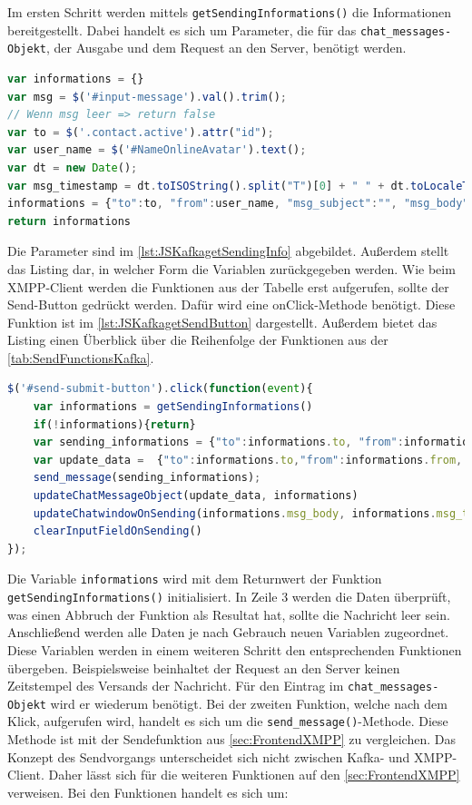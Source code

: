 \documentclass[a4paper,titlepage,halfparskip,12pt]{scrreprt}
\begin{document}
\begin{onehalfspacing}
Im ersten Schritt werden mittels \texttt{getSendingInformations()} die Informationen bereitgestellt. Dabei handelt es sich um Parameter, die für das \texttt{chat\_messages-Objekt}, der Ausgabe und dem Request an den Server, benötigt werden.
\begin{lstlisting}[language=Javascript,caption=\texttt{getSendingInformations()},label={lst:JSKafkagetSendingInfo}]
var informations = {}
var msg = $('#input-message').val().trim();
// Wenn msg leer => return false
var to = $('.contact.active').attr("id");
var user_name = $('#NameOnlineAvatar').text();
var dt = new Date();
var msg_timestamp = dt.toISOString().split("T")[0] + " " + dt.toLocaleTimeString().substring(0,5);
informations = {"to":to, "from":user_name, "msg_subject":"", "msg_body":msg,"msg_type":"chat", "msg_timestamp":msg_timestamp}
return informations
\end{lstlisting}
Die Parameter sind im \autoref{lst:JSKafkagetSendingInfo} abgebildet. Außerdem stellt das Listing dar, in welcher Form die Variablen zurückgegeben werden. Wie beim XMPP-Client werden die Funktionen aus der Tabelle erst aufgerufen, sollte der Send-Button gedrückt werden. Dafür wird eine \dq onClick\dq-Methode benötigt. Diese Funktion ist im \autoref{lst:JSKafkagetSendButton} dargestellt. Außerdem bietet das Listing einen Überblick über die Reihenfolge der Funktionen aus der \autoref{tab:SendFunctionsKafka}.
\begin{lstlisting}[language=Javascript,caption=Verknüpfte Funktion mit dem HTML-Element,label={lst:JSKafkagetSendButton}]
$('#send-submit-button').click(function(event){
	var informations = getSendingInformations()
	if(!informations){return}
	var sending_informations = {"to":informations.to, "from":informations.from, "msg_subject":informations.msg_subject, "msg_body":informations.msg_body,"msg_type":"chat"}
	var update_data =  {"to":informations.to,"from":informations.from, "msg_body":informations.msg_body, "msg_timestamp":informations.msg_timestamp}
	send_message(sending_informations);
	updateChatMessageObject(update_data, informations)
	updateChatwindowOnSending(informations.msg_body, informations.msg_timestamp)
	clearInputFieldOnSending()
});
\end{lstlisting}
Die Variable \texttt{informations} wird mit dem Returnwert der Funktion \texttt{getSendingInformations()} initialisiert. In Zeile 3 werden die Daten überprüft, was einen Abbruch der Funktion als Resultat hat, sollte die Nachricht leer sein. Anschließend werden alle Daten je nach Gebrauch neuen Variablen zugeordnet. Diese Variablen werden in einem weiteren Schritt den entsprechenden Funktionen übergeben. Beispielsweise beinhaltet der Request an den Server keinen Zeitstempel des Versands der Nachricht. Für den Eintrag im \texttt{chat\_messages-Objekt} wird er wiederum benötigt. Bei der zweiten Funktion, welche nach dem Klick, aufgerufen wird, handelt es sich um die \texttt{send\_message()}-Methode. Diese Methode ist mit der Sendefunktion aus \autoref{sec:FrontendXMPP} zu vergleichen. Das Konzept des Sendvorgangs unterscheidet sich nicht zwischen Kafka- und XMPP-Client. Daher lässt sich für die weiteren Funktionen auf den \autoref{sec:FrontendXMPP} verweisen. Bei den Funktionen handelt es sich um:

\end{onehalfspacing}
\end{document}

